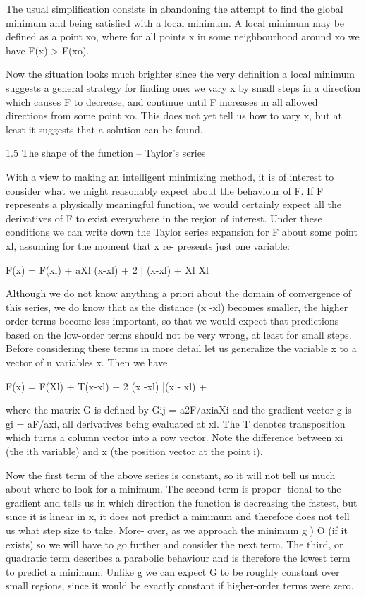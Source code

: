      The usual simplification consists in abandoning the attempt to find
the global minimum and being satisfied with a local minimum.  A local
minimum may be defined as a point xo, where for all points x in some
neighbourhood around xo we have F(x) > F(xo).
 
     Now the situation looks much brighter since the very definition
a local minimum suggests a general strategy for finding one:  we vary x
by small steps in a direction which causes F to decrease, and continue
until F increases in all allowed directions from some point xo.  This
does not yet tell us how to vary x, but at least it suggests that a solution
can be found.
 
 
1.5  The shape of the function -- Taylor's series
 
     With a view to making an intelligent minimizing method, it is of
interest to consider what we might reasonably expect about the behaviour
of F.  If F represents a physically meaningful function, we would certainly
expect all the derivatives of F to exist everywhere in the region of
interest.  Under these conditions we can write down the Taylor series
expansion for F about some point xl, assuming for the moment that x re-
presents just one variable:
 
 
               F(x) = F(xl) + aXl  (x-xl) + 2 |  (x-xl)  +
                       Xl             Xl
 
 
Although we do not know anything a priori about the domain of convergence
of this series, we do know that as the distance (x -xl) becomes smaller,
the higher order terms become less important, so that we would expect
that predictions based on the low-order terms should not be very wrong,
at least for small steps.  Before considering these terms in more detail
let us generalize the variable x to a vector of n variables x.  Then we
have
 
          F(x) = F(Xl) + T(x-xl) + 2 (x -xl)  |(x - xl) + 
 
 
          where the matrix G is defined by Gij = a2F/axiaXi and
          the gradient vector g is gi = aF/axi, all derivatives
          being evaluated at xl.  The T denotes transposition
          which turns a column vector into a row vector.  Note
          the difference between xi (the ith variable) and x
          (the position vector at the point i).
 
Now the first term of the above series is constant, so it will not tell
us much about where to look for a minimum.  The second term is propor-
tional to the gradient  and tells us in which direction the function is
decreasing the fastest, but since it is linear in x, it does not predict
a minimum and therefore does not tell us what step size to take.  More-
over, as we approach the minimum g ) O (if it exists) so we will have to
go further and consider the next term.  The third, or quadratic term
describes a parabolic behaviour and is therefore the lowest term to
predict a minimum.  Unlike g we can expect G to be roughly constant over
small regions, since it would be exactly constant if higher-order terms
were zero.
 
